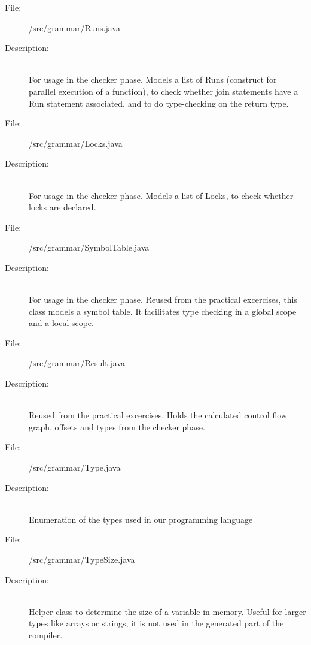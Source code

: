\documentclass[10pt,a4paper]{report}
\begin{document}
\begin{description}
	\item[File:] /src/grammar/Runs.java
	\item[Description:] \hfill \\
		For usage in the checker phase. Models a list of Runs (construct for parallel execution of a function), to check whether join statements have a Run statement associated, and to do type-checking on the return type.
\end{description}

\begin{description}
	\item[File:] /src/grammar/Locks.java
	\item[Description:] \hfill \\
		For usage in the checker phase. Models a list of Locks, to check whether locks are declared.
\end{description}

\begin{description}
	\item[File:] /src/grammar/SymbolTable.java
	\item[Description:] \hfill \\
		For usage in the checker phase. Reused from the practical excercises, this class models a symbol table. It facilitates type checking in a global scope and a local scope. 
\end{description}

\begin{description}
	\item[File:] /src/grammar/Result.java
	\item[Description:] \hfill \\
		Reused from the practical excercises. Holds the calculated control flow graph, offsets and types from the checker phase. 
\end{description}

\begin{description}
	\item[File:] /src/grammar/Type.java
	\item[Description:] \hfill \\
		Enumeration of the types used in our programming language
\end{description}

\begin{description}
	\item[File:] /src/grammar/TypeSize.java
	\item[Description:] \hfill \\
		Helper class to determine the size of a variable in memory. Useful for larger types like arrays or strings, it is not used in the generated part of the compiler.
\end{description}
\end{document}
